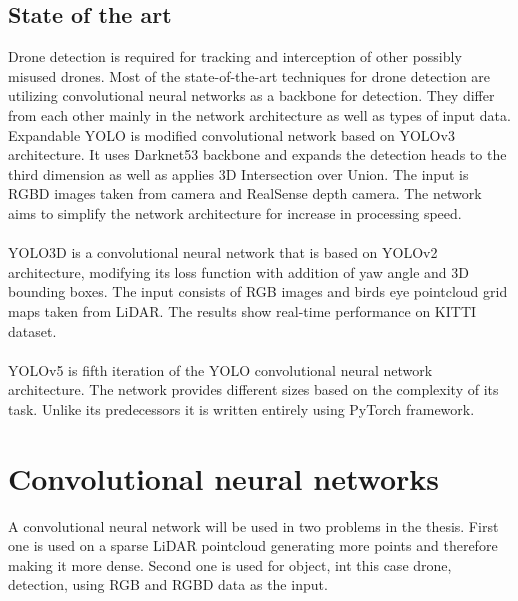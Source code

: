 \documentclass[twoside]{ctuthesis}
\theoremstyle{plain}
\theoremstyle{definition}
\theoremstyle{note}
\begin{document}
\section{State of the art}
Drone detection is required for tracking and interception of other possibly misused drones. Most of the state-of-the-art techniques for drone detection are utilizing convolutional neural networks as a backbone for detection. They differ from each other mainly in the network architecture as well as types of input data. \newline
\newline
Expandable YOLO is modified convolutional network based on YOLOv3 architecture. It uses Darknet53 backbone and expands the detection heads to the third dimension as well as applies 3D Intersection over Union. The input is RGBD images taken from camera and RealSense depth camera. The network aims to simplify the network architecture for increase in processing speed.\\
\\
YOLO3D is a convolutional neural network that is based on YOLOv2 architecture, modifying its loss function with addition of yaw angle and 3D bounding boxes. The input consists of RGB images and birds eye pointcloud grid maps taken from LiDAR. The results show real-time performance on KITTI dataset.\\
\\
YOLOv5 is fifth iteration of the YOLO convolutional neural network architecture. The network provides different sizes based on the complexity of its task. Unlike its predecessors it is written entirely using PyTorch framework. 
\chapter{Convolutional neural networks}
A convolutional neural network will be used in two problems in the thesis. First one is used on a sparse LiDAR pointcloud generating more points and therefore making it more dense. Second one is used for object, int this case drone, detection, using RGB and RGBD data as the input.
\end{document}
